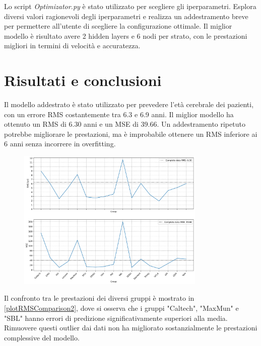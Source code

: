 \documentclass[10pt]{article}
\begin{document}
Lo script \textit{Optimizator.py} è stato utilizzato per scegliere gli iperparametri. Esplora diversi valori ragionevoli degli iperparametri e realizza un addestramento breve per permettere all'utente di scegliere la configurazione ottimale. Il miglior modello è risultato avere 2 hidden layers e 6 nodi per strato, con le prestazioni migliori in termini di velocità e accuratezza.

\section{Risultati e conclusioni}

Il modello addestrato è stato utilizzato per prevedere l'età cerebrale dei pazienti, con un errore RMS costantemente tra 6.3 e 6.9 anni. Il miglior modello ha ottenuto un RMS di 6.30 anni e un MSE di 39.66. Un addestramento ripetuto potrebbe migliorare le prestazioni, ma è improbabile ottenere un RMS inferiore ai 6 anni senza incorrere in overfitting.

	\begin{figure}
		\includegraphics[width=0.8\textwidth]{result_1.png}
		\label{plotRMSComparison2}
	\end{figure}

Il confronto tra le prestazioni dei diversi gruppi è mostrato in \autoref{plotRMSComparison2}, dove si osserva che i gruppi "Caltech", "MaxMun" e "SBL" hanno errori di predizione significativamente superiori alla media. Rimuovere questi outlier dai dati non ha migliorato sostanzialmente le prestazioni complessive del modello.
\end{document}
